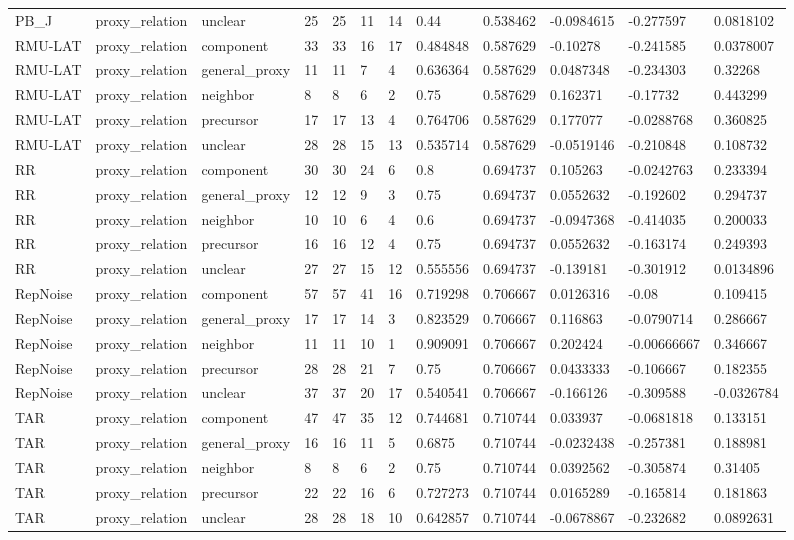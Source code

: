 \begin{table}[ht]
\begin{tabular}{llllllllllll}
PB\_J & proxy\_relation & unclear & 25 & 25 & 11 & 14 & 0.44 & 0.538462 & -0.0984615 & -0.277597 & 0.0818102 \\
RMU-LAT & proxy\_relation & component & 33 & 33 & 16 & 17 & 0.484848 & 0.587629 & -0.10278 & -0.241585 & 0.0378007 \\
RMU-LAT & proxy\_relation & general\_proxy & 11 & 11 & 7 & 4 & 0.636364 & 0.587629 & 0.0487348 & -0.234303 & 0.32268 \\
RMU-LAT & proxy\_relation & neighbor & 8 & 8 & 6 & 2 & 0.75 & 0.587629 & 0.162371 & -0.17732 & 0.443299 \\
RMU-LAT & proxy\_relation & precursor & 17 & 17 & 13 & 4 & 0.764706 & 0.587629 & 0.177077 & -0.0288768 & 0.360825 \\
RMU-LAT & proxy\_relation & unclear & 28 & 28 & 15 & 13 & 0.535714 & 0.587629 & -0.0519146 & -0.210848 & 0.108732 \\
RR & proxy\_relation & component & 30 & 30 & 24 & 6 & 0.8 & 0.694737 & 0.105263 & -0.0242763 & 0.233394 \\
RR & proxy\_relation & general\_proxy & 12 & 12 & 9 & 3 & 0.75 & 0.694737 & 0.0552632 & -0.192602 & 0.294737 \\
RR & proxy\_relation & neighbor & 10 & 10 & 6 & 4 & 0.6 & 0.694737 & -0.0947368 & -0.414035 & 0.200033 \\
RR & proxy\_relation & precursor & 16 & 16 & 12 & 4 & 0.75 & 0.694737 & 0.0552632 & -0.163174 & 0.249393 \\
RR & proxy\_relation & unclear & 27 & 27 & 15 & 12 & 0.555556 & 0.694737 & -0.139181 & -0.301912 & 0.0134896 \\
RepNoise & proxy\_relation & component & 57 & 57 & 41 & 16 & 0.719298 & 0.706667 & 0.0126316 & -0.08 & 0.109415 \\
RepNoise & proxy\_relation & general\_proxy & 17 & 17 & 14 & 3 & 0.823529 & 0.706667 & 0.116863 & -0.0790714 & 0.286667 \\
RepNoise & proxy\_relation & neighbor & 11 & 11 & 10 & 1 & 0.909091 & 0.706667 & 0.202424 & -0.00666667 & 0.346667 \\
RepNoise & proxy\_relation & precursor & 28 & 28 & 21 & 7 & 0.75 & 0.706667 & 0.0433333 & -0.106667 & 0.182355 \\
RepNoise & proxy\_relation & unclear & 37 & 37 & 20 & 17 & 0.540541 & 0.706667 & -0.166126 & -0.309588 & -0.0326784 \\
TAR & proxy\_relation & component & 47 & 47 & 35 & 12 & 0.744681 & 0.710744 & 0.033937 & -0.0681818 & 0.133151 \\
TAR & proxy\_relation & general\_proxy & 16 & 16 & 11 & 5 & 0.6875 & 0.710744 & -0.0232438 & -0.257381 & 0.188981 \\
TAR & proxy\_relation & neighbor & 8 & 8 & 6 & 2 & 0.75 & 0.710744 & 0.0392562 & -0.305874 & 0.31405 \\
TAR & proxy\_relation & precursor & 22 & 22 & 16 & 6 & 0.727273 & 0.710744 & 0.0165289 & -0.165814 & 0.181863 \\
TAR & proxy\_relation & unclear & 28 & 28 & 18 & 10 & 0.642857 & 0.710744 & -0.0678867 & -0.232682 & 0.0892631 \\
\hline
\end{tabular}
\end{table}
